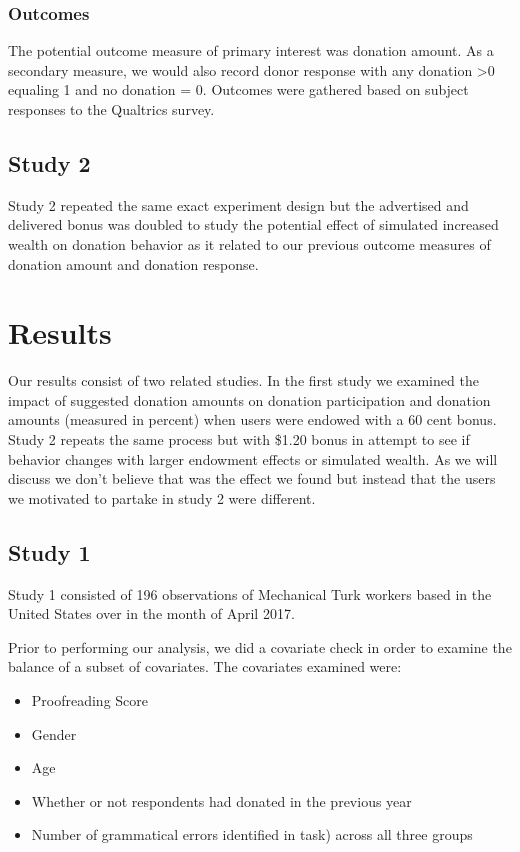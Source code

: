 \documentclass[]{article}
\providecommand{\tightlist}{%
  \setlength{\itemsep}{0pt}\setlength{\parskip}{0pt}}
\begin{document}
\subsubsection{Outcomes}\label{outcomes}

The potential outcome measure of primary interest was donation amount.
As a secondary measure, we would also record donor response with any
donation \textgreater{}0 equaling 1 and no donation = 0. Outcomes were
gathered based on subject responses to the Qualtrics survey.

\subsection{Study 2}\label{study-2}

Study 2 repeated the same exact experiment design but the advertised and
delivered bonus was doubled to study the potential effect of simulated
increased wealth on donation behavior as it related to our previous
outcome measures of donation amount and donation response.

\section{Results}\label{results}

Our results consist of two related studies. In the first study we
examined the impact of suggested donation amounts on donation
participation and donation amounts (measured in percent) when users were
endowed with a 60 cent bonus. Study 2 repeats the same process but with
\$1.20 bonus in attempt to see if behavior changes with larger endowment
effects or simulated wealth. As we will discuss we don't believe that
was the effect we found but instead that the users we motivated to
partake in study 2 were different.

\subsection{Study 1}\label{study-1-1}

Study 1 consisted of 196 observations of Mechanical Turk workers based
in the United States over in the month of April 2017.

Prior to performing our analysis, we did a covariate check in order to
examine the balance of a subset of covariates. The covariates examined
were:

\begin{itemize}
\tightlist
\item
  Proofreading Score
\item
  Gender
\item
  Age
\item
  Whether or not respondents had donated in the previous year
\item
  Number of grammatical errors identified in task) across all three
  groups
\end{itemize}
\end{document}
